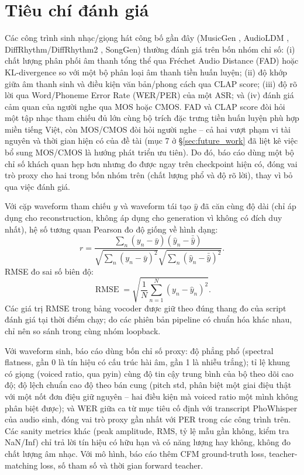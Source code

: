 \documentclass[a4paper,13pt,oneside]{report}
\begin{document}
\section{Tiêu chí đánh giá}

Các công trình sinh nhạc/giọng hát công bố gần đây (MusicGen \cite{musicgen}, AudioLDM \cite{audioldm}, DiffRhythm/DiffRhythm2 \cite{diffrhythm,diffrhythm2}, SongGen) thường đánh giá trên bốn nhóm chỉ số: (i) chất lượng phân phối âm thanh tổng thể qua Fréchet Audio Distance (FAD) hoặc KL-divergence so với một bộ phân loại âm thanh tiền huấn luyện; (ii) độ khớp giữa âm thanh sinh và điều kiện văn bản/phong cách qua CLAP score; (iii) độ rõ lời qua Word/Phoneme Error Rate (WER/PER) của một ASR; và (iv) đánh giá cảm quan của người nghe qua MOS hoặc CMOS. FAD và CLAP score đòi hỏi một tập nhạc tham chiếu đủ lớn cùng bộ trích đặc trưng tiền huấn luyện phù hợp miền tiếng Việt, còn MOS/CMOS đòi hỏi người nghe -- cả hai vượt phạm vi tài nguyên và thời gian hiện có của đề tài (mục 7 ở \S\ref{sec:future_work} đã liệt kê việc bổ sung MOS/CMOS là hướng phát triển ưu tiên). Do đó, báo cáo dùng một bộ chỉ số khách quan hẹp hơn nhưng đo được ngay trên checkpoint hiện có, đóng vai trò proxy cho hai trong bốn nhóm trên (chất lượng phổ và độ rõ lời), thay vì bỏ qua việc đánh giá.

Với cặp waveform tham chiếu $y$ và waveform tái tạo $\hat{y}$ đã căn cùng độ dài (chỉ áp dụng cho reconstruction, không áp dụng cho generation vì không có đích duy nhất), hệ số tương quan Pearson đo độ giống về hình dạng:
\begin{equation}
 r=\frac{\sum_n(y_n-\bar{y})(\hat{y}_n-\bar{\hat{y}})}
 {\sqrt{\sum_n(y_n-\bar{y})^2}\sqrt{\sum_n(\hat{y}_n-\bar{\hat{y}})^2}}.
\end{equation}
RMSE đo sai số biên độ:
\begin{equation}
 \operatorname{RMSE}=\sqrt{\frac{1}{N}\sum_{n=1}^{N}(y_n-\hat{y}_n)^2}.
\end{equation}
Các giá trị RMSE trong bảng vocoder được giữ theo đúng thang đo của script đánh giá tại thời điểm chạy; do các phiên bản pipeline có chuẩn hóa khác nhau, chỉ nên so sánh trong cùng nhóm loopback.

Với waveform sinh, báo cáo dùng bốn chỉ số proxy: độ phẳng phổ (spectral flatness, gần 0 là tín hiệu có cấu trúc hài âm, gần 1 là nhiễu trắng); tỉ lệ khung có giọng (voiced ratio, qua pyin) cùng độ tin cậy trung bình của bộ theo dõi cao độ; độ lệch chuẩn cao độ theo bán cung (pitch std, phân biệt một giai điệu thật với một nốt đơn điệu giữ nguyên -- hai điều kiện mà voiced ratio một mình không phân biệt được); và WER giữa ca từ mục tiêu cố định với transcript PhoWhisper của audio sinh, đóng vai trò proxy gần nhất với PER trong các công trình trên. Các sanity metrics khác (peak amplitude, RMS, tỷ lệ mẫu gần không, kiểm tra NaN/Inf) chỉ trả lời tín hiệu có hữu hạn và có năng lượng hay không, không đo chất lượng âm nhạc. Với mô hình, báo cáo thêm CFM ground-truth loss, teacher-matching loss, số tham số và thời gian forward teacher.
\end{document}
